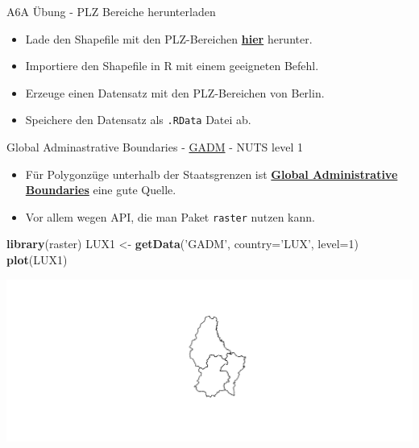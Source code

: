 \documentclass[ignorenonframetext,]{beamer}
\newenvironment{Shaded}{\begin{snugshade}}{\end{snugshade}}
\newcommand{\DataTypeTok}[1]{\textcolor[rgb]{0.13,0.29,0.53}{#1}}
\newcommand{\DecValTok}[1]{\textcolor[rgb]{0.00,0.00,0.81}{#1}}
\newcommand{\KeywordTok}[1]{\textcolor[rgb]{0.13,0.29,0.53}{\textbf{#1}}}
\newcommand{\NormalTok}[1]{#1}
\newcommand{\StringTok}[1]{\textcolor[rgb]{0.31,0.60,0.02}{#1}}
\providecommand{\tightlist}{%
  \setlength{\itemsep}{0pt}\setlength{\parskip}{0pt}}
\begin{document}
\begin{frame}[fragile]{A6A Übung - PLZ Bereiche herunterladen}
\protect\hypertarget{a6a-ubung---plz-bereiche-herunterladen}{}

\begin{itemize}
\tightlist
\item
  Lade den Shapefile mit den PLZ-Bereichen
  \href{http://arnulf.us/PLZ}{\textbf{hier}} herunter.
\item
  Importiere den Shapefile in R mit einem geeigneten Befehl.
\item
  Erzeuge einen Datensatz mit den PLZ-Bereichen von Berlin.
\item
  Speichere den Datensatz als \texttt{.RData} Datei ab.
\end{itemize}

\end{frame}

\begin{frame}[fragile]{Global Adminastrative Boundaries -
\href{http://www.gadm.org/}{GADM} - NUTS level 1}
\protect\hypertarget{global-adminastrative-boundaries---gadm---nuts-level-1}{}

\begin{itemize}
\tightlist
\item
  Für Polygonzüge unterhalb der Staatsgrenzen ist
  \href{http://www.gadm.org/}{\textbf{Global Administrative Boundaries}}
  eine gute Quelle.
\item
  Vor allem wegen API, die man Paket \texttt{raster} nutzen kann.
\end{itemize}

\begin{Shaded}
\begin{Highlighting}[]
\KeywordTok{library}\NormalTok{(raster)}
\NormalTok{LUX1 <-}\StringTok{ }\KeywordTok{getData}\NormalTok{(}\StringTok{'GADM'}\NormalTok{, }\DataTypeTok{country=}\StringTok{'LUX'}\NormalTok{, }\DataTypeTok{level=}\DecValTok{1}\NormalTok{)}
\KeywordTok{plot}\NormalTok{(LUX1)}
\end{Highlighting}
\end{Shaded}

\includegraphics{A6_Shapefiles_files/figure-beamer/unnamed-chunk-25-1.pdf}

\end{frame}
\end{document}
